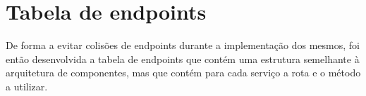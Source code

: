 \newpage

\section{Tabela de endpoints}
De forma a evitar colisões de endpoints durante a implementação dos mesmos, foi então desenvolvida a 
tabela de endpoints que contém uma estrutura semelhante à arquitetura de componentes, mas que contém 
para cada serviço a rota e o método a utilizar.



\newpage

